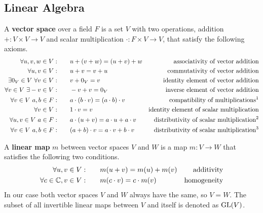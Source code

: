 \subsection{Linear Algebra}

A \textbf{vector space} over a field $F$ is a set $V$ with two operations, addition $+: V \times V \to V$ and scalar multiplication $\cdot: F \times V \to V$, that satisfy the following axioms.
\begin{align}
    \forall u, v, w \in V: \qquad & u + (v + w) = (u + v) + w & \text{associativity of vector addition} \\
    \forall u, v \in V: \qquad & u + v = v + u & \text{commutativity of vector addition} \\
    \exists 0_V \in V\ \forall v \in V: \qquad & v + 0_V = v & \text{identity element of vector addition} \\
    \forall v \in V\ \exists -v \in V: \qquad & -v + v = 0_V & \text{inverse element of vector addition} \\
    \forall v \in V\ a, b \in F: \qquad & a \cdot (b \cdot v) = (a \cdot b) \cdot v & \text{compatibility of multiplications\footnotemark} \\
    \forall v \in V: \qquad & 1 \cdot v = v & \text{identity element of scalar multiplication} \\
    \forall u, v \in V\ a \in F: \qquad & a \cdot (u + v) = a \cdot u + a \cdot v & \text{distributivity of scalar multiplication\footnotemark} \\
    \forall v \in V\ a, b \in F: \qquad & (a + b) \cdot v = a \cdot v + b \cdot v & \text{distributivity of scalar multiplication\footnotemark}
\end{align}

A \textbf{linear map} $m$ between vector spaces $V$ and $W$ is a map $m: V \to W$ that satisfies the following two conditions.
\begin{align}
    \forall u, v \in V: \qquad & m(u + v) = m(u) + m(v) & \text{additivity} \\
    \forall c \in \mathbb{C}, v \in V: \qquad & m(c \cdot v) = c \cdot m(v) & \text{homogeneity}
\end{align}
In our case both vector spaces $V$ and $W$ always have the same, so $V = W$.
The subset of all invertible linear maps between $V$ and itself is denoted as $\operatorname{GL}(V)$.
\\


